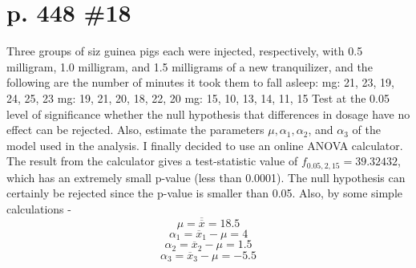 \documentclass[12pt]{article}
\begin{document}
  \section[20pt]{p. 448 \#18}
  Three groups of siz guinea pigs each were injected, respectively, with 0.5 milligram, 1.0 milligram, and 1.5 milligrams of a new tranquilizer, and the following are the number of minutes it took them to fall asleep:
  \newline {} mg: 21, 23, 19, 24, 25, 23
   mg: 19, 21, 20, 18, 22, 20
   mg: 15, 10, 13, 14, 11, 15
  \newline \newline
  Test at the 0.05 level of significance whether the null hypothesis that differences in dosage have no effect can be rejected. Also, estimate the parameters \(\mu, \alpha_1, \alpha_2\), and \(\alpha_3\) of the model used in the analysis.
  \newline \newline
  I finally decided to use an online ANOVA calculator.
  \newline
  The result from the calculator gives a test-statistic value of
  \(f_{0.05, 2, 15} = 39.32432\), which has an extremely small p-value (less than 0.0001).
  \newline
  The null hypothesis can certainly be rejected since the p-value is smaller than 0.05.
  \newline
  \newline
  Also, by some simple calculations -
  \[\mu = \overline{\overline{x}} = 18.5\]
  \[\alpha_1 = \overline{x}_1-\mu = 4\]
  \[\alpha_2 = \overline{x}_2-\mu = 1.5\]
  \[\alpha_3 = \overline{x}_3-\mu = -5.5\]
\end{document}
